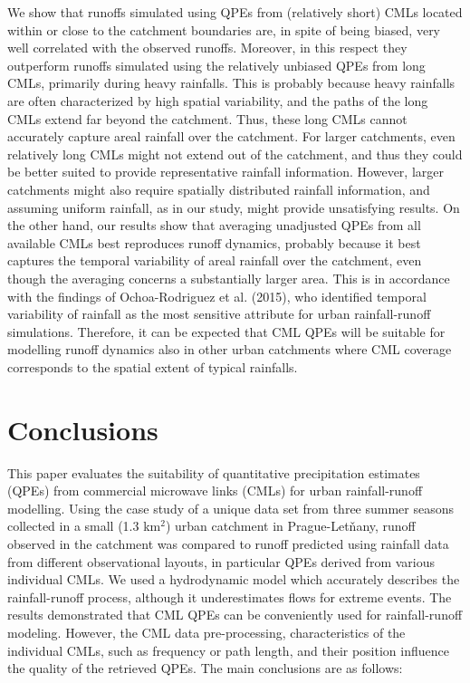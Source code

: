 \documentclass{ctuthesis}\usepackage[]{graphicx}\usepackage[]{color}
\begin{document}
We show that runoffs simulated using QPEs from (relatively short) CMLs located within or close to the catchment boundaries are, in spite of being biased, very well correlated with the observed runoffs. Moreover, in this respect they outperform runoffs simulated using the relatively unbiased QPEs from long CMLs, primarily during heavy rainfalls. This is probably because heavy rainfalls are often characterized by high spatial variability, and the paths of the long CMLs extend far beyond the catchment. Thus, these long CMLs cannot accurately capture areal rainfall over the catchment. For larger catchments, even relatively long CMLs might not extend out of the catchment, and thus they could be better suited to provide representative rainfall information. However, larger catchments might also require spatially distributed rainfall information, and assuming uniform rainfall, as in our study, might provide unsatisfying results. On the other hand, our results show that averaging unadjusted QPEs from all available CMLs best reproduces runoff dynamics, probably because it best captures the temporal variability of areal rainfall over the catchment, even though the averaging concerns a substantially larger area. This is in accordance with the findings of Ochoa-Rodriguez et al. (2015), who identified temporal variability of rainfall as the most sensitive attribute for urban rainfall-runoff simulations. Therefore, it can be expected that CML QPEs will be suitable for modelling runoff dynamics also in other urban catchments where CML coverage corresponds to the spatial extent of typical rainfalls.

\section{Conclusions}

This paper evaluates the suitability of quantitative precipitation estimates (QPEs) from commercial microwave links (CMLs) for urban rainfall-runoff modelling. Using the case study of a unique data set from three summer seasons collected in a small (1.3 km$^2$) urban catchment in Prague-Letňany, runoff observed in the catchment was compared to runoff predicted using rainfall data from different observational layouts, in particular QPEs derived from various individual CMLs. We used a hydrodynamic model which accurately describes the rainfall-runoff process, although it underestimates flows for extreme events. The results demonstrated that CML QPEs can be conveniently used for rainfall-runoff modeling. However, the CML data pre-processing, characteristics of the individual CMLs, such as frequency or path length, and their position influence the quality of the retrieved QPEs. The main conclusions are as follows:
\end{document}
